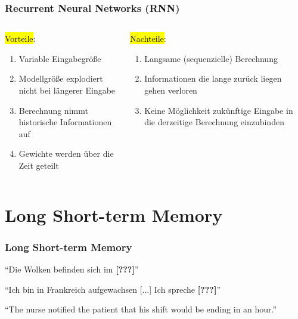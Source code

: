 \documentclass[german,aspectratio=169]{beamer}
\begin{document}
\begin{frame}
	\frametitle{Recurrent Neural Networks (RNN)}
	\begin{columns}
		\begin{column}{0.5\textwidth}
			\hl{Vorteile}:
			\begin{enumerate}[label={\color{mygreen}\textbf{+}}]
				\item Variable Eingabegröße
				\item Modellgröße explodiert nicht bei längerer Eingabe
				\item Berechnung nimmt historische Informationen auf
				\item Gewichte werden über die Zeit geteilt
			\end{enumerate}
		\end{column}
		\hfill
		\begin{column}{0.5\textwidth}
		\hl{Nachteile}:
		\begin{enumerate}[label={\color{myred}\textbf{-}}]
			\item Langsame (sequenzielle) Berechnung
			\item Informationen die lange zurück liegen gehen verloren
			\item Keine Möglichkeit zukünftige Eingabe in die derzeitige Berechnung einzubinden
		\end{enumerate}
	\end{column}
\end{columns}
\end{frame}


\section{Long Short-term Memory}
\begin{frame}
	\frametitle{Long Short-term Memory}
	
	\begin{center}
		``Die Wolken befinden sich im \textbf{[???]}''
	\end{center}

	\vspace{0.5cm}
	
	\begin{center}
		``Ich bin in Frankreich aufgewachsen [...] Ich spreche \textbf{[???]}''
	\end{center}
		
	\vspace{0.5cm}
	
	\begin{center}
		``The nurse notified the patient that his shift would be ending in an hour.''
	\end{center}

\end{frame}
\end{document}
